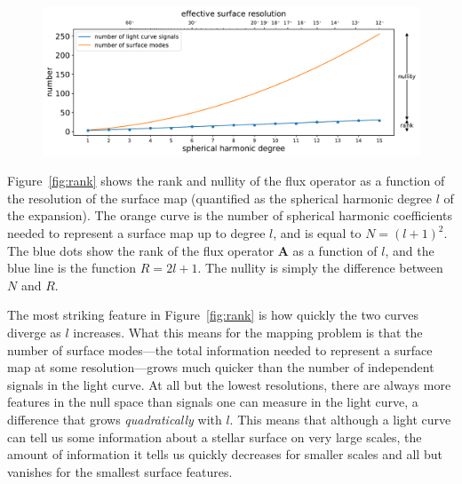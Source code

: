 \documentclass[modern]{aastex62}
\begin{document}
\begin{figure}[t!]
    \begin{centering}
        \includegraphics[width=\linewidth]{figures/rank.pdf}
    \end{centering}
\end{figure}

Figure~\ref{fig:rank} shows the rank and nullity of the flux operator
as a function of the resolution of the surface map (quantified as the
spherical harmonic degree $l$ of the expansion). The orange
curve is the number of spherical harmonic coefficients needed to
represent a surface map up to degree $l$, and is equal to $N = (l + 1)^2$.
The blue dots show the rank of the flux operator $\mathbf{A}$ as a function
of $l$, and the blue line is the function $R = 2l + 1$. The nullity is
simply the difference between $N$ and $R$.

The most striking feature in Figure~\ref{fig:rank} is how quickly the two
curves diverge as $l$ increases. What this means for the mapping problem
is that the number of surface modes---the total information needed to
represent a surface map at some resolution---grows much quicker than the
number of independent signals in the light curve.
%
At all but the lowest resolutions, there are always more features in the
null space than signals one can measure in the light curve, a difference
that grows \emph{quadratically} with $l$.
%
This means that although a light curve can tell us some information about
a stellar surface on very large scales, the amount of information it tells
us quickly decreases for smaller scales and all but vanishes for the smallest
surface features.
\end{document}
